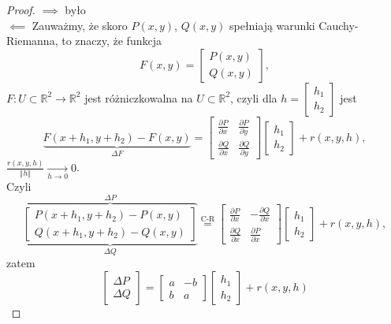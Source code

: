 \documentclass[../main.tex]{subfiles}
\begin{document}
    \begin{proof}
        $\implies$ było\\
        $\impliedby$ Zauważmy, że skoro $P(x,y)$, $Q(x,y)$ spełniają warunki Cauchy-Riemanna, to znaczy, że funkcja
        \[
            F(x,y) = \begin{bmatrix} P(x,y)\\Q(x,y) \end{bmatrix}
        ,\]
    $F: U\subset\mathbb{R}^2\to \mathbb{R}^2$ jest różniczkowalna na $U\subset\mathbb{R}^2$, czyli dla $h = \begin{bmatrix} h_1\\h_2 \end{bmatrix} $ jest
        \[
            \underbrace{F(x+h_1, y+h_2) - F(x,y)}_{\Delta F} = \begin{bmatrix} \frac{\partial P}{\partial x} & \frac{\partial P}{\partial y} \\ \frac{\partial Q}{\partial x} & \frac{\partial Q}{\partial y}  \end{bmatrix} \begin{bmatrix} h_1\\h_2 \end{bmatrix} + r(x,y,h)
        ,\]
    $\frac{r(x,y,h)}{\left\Vert h \right\Vert } \underset{h \to 0}{\longrightarrow} 0$.\\
        Czyli
        \[
            \underbrace{\overbrace{\begin{bmatrix} P(x+h_1, y+h_2) - P(x,y)\\ Q(x+h_1, y+h_2) - Q(x,y) \end{bmatrix}}^{\Delta P}}_{\Delta Q} \overset{\text{C-R}}{=} \begin{bmatrix} \frac{\partial P}{\partial x} & - \frac{\partial Q}{\partial x} \\ \frac{\partial Q}{\partial x} & \frac{\partial P}{\partial x}  \end{bmatrix} \begin{bmatrix} h_1\\h_2 \end{bmatrix} + r(x,y,h)
        ,\]
    zatem
        \[
            \begin{bmatrix} \Delta P\\ \Delta Q \end{bmatrix} = \begin{bmatrix} a& -b\\ b & a \end{bmatrix} \begin{bmatrix} h_1\\h_2 \end{bmatrix} + r(x,y,h)
\]
\end{proof}
\end{document}
